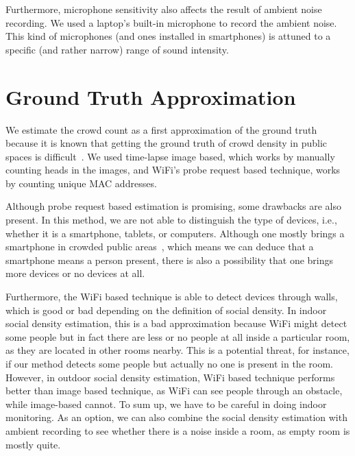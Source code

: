 Furthermore, microphone sensitivity also affects the result of ambient noise recording. We used a laptop's built-in microphone to record the ambient noise. This kind of microphones (and ones installed in smartphones) is attuned to a specific (and rather narrow) range of sound intensity.




\section{Ground Truth Approximation} %
\label{sec:ground_truth_approximation}
We estimate the crowd count as a first approximation of the ground truth because it is known that getting the ground truth of crowd density in public spaces is difficult~\cite{thesis041}. We used time-lapse image based, which works by manually counting heads in the images, and WiFi's probe request based technique, works by counting unique \ac{MAC} addresses.

Although probe request based estimation is promising, some drawbacks are also present. In this method, we are not able to distinguish the type of devices, i.e., whether it is a smartphone, tablets, or computers. Although one mostly brings a smartphone in crowded public areas~\cite{thesis047}, which means we can deduce that a smartphone means a person present, there is also a possibility that one brings more devices or no devices at all.

Furthermore, the WiFi based technique is able to detect devices through walls, which is good or bad depending on the definition of social density. In indoor social density estimation, this is a bad approximation because WiFi might detect some people but in fact there are less or no people at all inside a particular room, as they are located in other rooms nearby. This is a potential threat, for instance, if our method detects some people but actually no one is present in the room. However, in outdoor social density estimation, WiFi based technique performs better than image based technique, as WiFi can see people through an obstacle, while image-based cannot. To sum up, we have to be careful in doing indoor monitoring. As an option, we can also combine the social density estimation with ambient recording to see whether there is a noise inside a room, as empty room is mostly quite.

